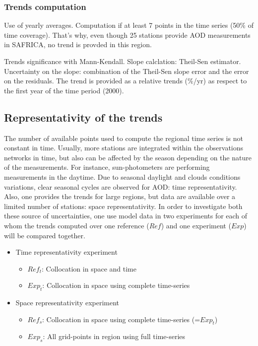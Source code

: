 \documentclass[journal abbreviation, manuscript]{copernicus}
\begin{document}
\subsubsection{Trends computation}
Use of yearly averages. Computation if at least 7 points in the time series (50\% of time coverage). That's why, even though 25 stations provide AOD measurements in SAFRICA, no trend is provded in this region.

Trends significance with Mann-Kendall.
Slope calclation: Theil-Sen estimator.
Uncertainty on the slope: combination of the Theil-Sen slope error and the error on the residuals.
The trend is provided as a relative trends (\%/yr) as respect to the first year of the time period (2000).

\subsection{Representativity of the trends}
The number of available points used to compute the regional time series is not constant in time. Usually, more stations are integrated within the observations networks in time, but also can be affected by the season depending on the nature of the measurements. For instance, sun-photometers are performing measurements in the daytime. Due to seasonal daylight and clouds conditions variations, clear seasonal cycles are observed for AOD: time representativity.
Also, one provides the trends for large regions, but data are available over a limited number of stations: space representativity.
In order to investigate both these source of uncertainties, one use model data in two experiments for each of whom the trends computed over one reference ($Ref$) and one experiment ($Exp$) will be compared together.
\begin{itemize}
 \item Time representativity experiment
       \begin{itemize}
        \item $Ref_{t}$: Collocation in space and time
        \item $Exp_{t}$: Collocation in space using complete time-series
       \end{itemize}
 \item Space representativity experiment
       \begin{itemize}
        \item $Ref_{s}$: Collocation in space using complete time-series (=$Exp_{t}$)
        \item $Exp_{s}$: All grid-points in region using full time-series
       \end{itemize}
\end{itemize}
\end{document}
